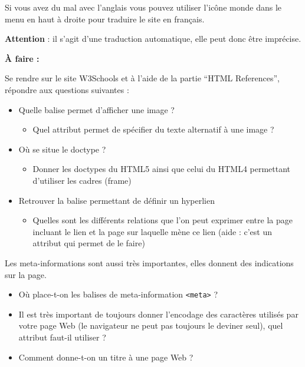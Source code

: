 \documentclass[11pt]{article}
\begin{document}
Si vous avez du mal avec l'anglais vous pouvez utiliser l'icône monde dans le menu en haut à droite pour traduire le site en français.

\textbf{Attention} : il s'agit d'une traduction automatique, elle peut donc être imprécise.

\newpage
\begin{afaire}
\textbf{À faire :}

Se rendre sur le site W3Schools et à l'aide de la partie ``HTML References'', répondre aux questions suivantes :

\begin{itemize}
    \item Quelle balise permet d'afficher une image ?
    \begin{itemize}
        \item Quel attribut permet de spécifier du texte alternatif à une image ?
    \end{itemize}
    \item Où se situe le doctype ?
    \begin{itemize}
        \item Donner les doctypes du HTML5 ainsi que celui du HTML4 permettant d'utiliser les cadres (frame)
    \end{itemize}
    \item Retrouver la balise permettant de définir un hyperlien
    \begin{itemize}
        \item Quelles sont les différents relations que l'on peut exprimer entre la page incluant le lien et la page sur laquelle mène ce lien (aide : c'est un attribut qui permet de le faire)
    \end{itemize}
\end{itemize}

Les meta-informations sont aussi très importantes, elles donnent des indications sur la page.

\begin{itemize}
    \item Où place-t-on les balises de meta-information \texttt{<meta>} ?
    \item Il est très important de toujours donner l'encodage des caractères utilisés par votre page Web (le navigateur ne peut pas toujours le deviner seul), quel attribut faut-il utiliser ?
    \item Comment donne-t-on un titre à une page Web ?
\end{itemize}
\end{afaire}
\end{document}
